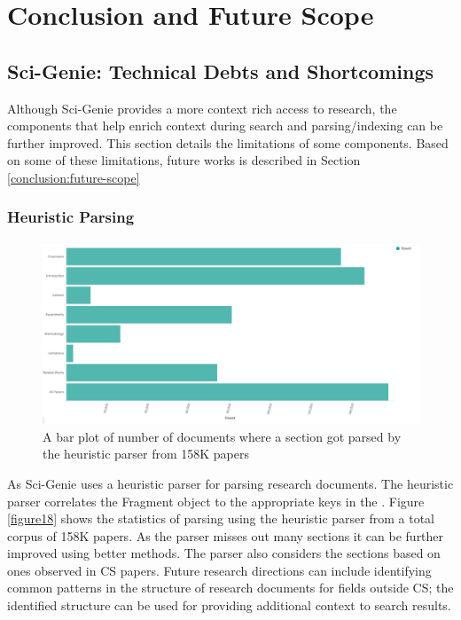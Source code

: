 \chapter{Conclusion and Future Scope}
\label{conclusion}

\section{Sci-Genie: Technical Debts and Shortcomings}
Although Sci-Genie provides a more context rich access to research, the components that help enrich context during search and parsing/indexing can be further improved. This section details the limitations of some components. Based on some of these limitations, future works is described in Section \ref{conclusion:future-scope}

\subsection{Heuristic Parsing}
\begin{figure}[h]
    \centering
    \includegraphics[width=\maxwidth{\textwidth}]{src/images/parsing-stats.pdf}
    \caption{ A bar plot of number of documents where a section got parsed by the heuristic parser from 158K papers}
    \label{figure\arabic{figurecounter}}
\end{figure}
As Sci-Genie uses a heuristic parser for parsing research documents. The heuristic parser correlates the Fragment object to the appropriate keys in the . Figure \ref{figure18} shows the statistics of parsing using the heuristic parser from a total corpus of 158K papers. As the parser misses out many sections it can be further improved using better methods. The parser also considers the sections based on ones observed in CS papers. Future research directions can include identifying common patterns in the structure of research documents for fields outside CS; the identified structure can be used for providing additional context to search results. 


